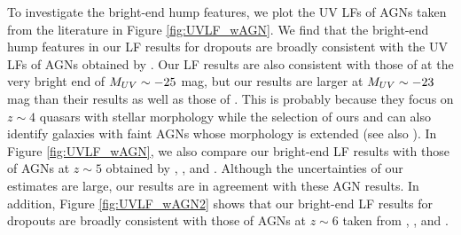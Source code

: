 \documentclass[]{pasj01}
\begin{document}
To investigate the bright-end hump features, 
we plot the UV LFs of AGNs taken from the literature in Figure \ref{fig:UVLF_wAGN}. 
%
We find that the bright-end hump features in our LF results for dropouts 
are broadly consistent with the UV LFs of AGNs  
obtained by \citet{2011ApJ...728L..26G}. 
Our LF results are also consistent with 
those of \citet{2017arXiv170405996A} at the very bright end of $M_{\rm UV} \sim -25$ mag, 
but our results are larger at $M_{\rm UV} \sim -23$ mag 
than their results as well as those of \citet{2016ApJ...832..208N}. 
This is probably because 
they focus on $z\sim4$ quasars with stellar morphology 
while the selection of ours and \citet{2011ApJ...728L..26G} 
can also identify galaxies with faint AGNs whose morphology is extended 
(see also \citet{2017arXiv170405996A}). 
%
In Figure \ref{fig:UVLF_wAGN}, 
we also compare our bright-end LF results with those of AGNs at $z \sim 5$ 
obtained by \citet{2012ApJ...756..160I}, \citet{2013ApJ...768..105M}, and \citet{2016ApJ...832..208N}. 
Although the uncertainties of our estimates are large, 
our results are in agreement with these AGN results. 
In addition, Figure \ref{fig:UVLF_wAGN2} shows that 
our bright-end LF results for dropouts are broadly consistent with 
those of AGNs at $z \sim 6$ taken from 
\citet{2010AJ....139..906W}, \citet{2015ApJ...798...28K}, and \citet{2016ApJ...833..222J}. 
\end{document}
